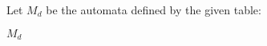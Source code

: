 Let $M_d$ be the automata defined by the given table:
\begin{automata}{$M_d$}
	
	
	
	
	
	
	
	
	
\end{automata}
